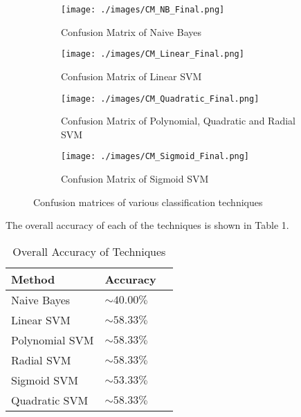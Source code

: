 \documentclass{article}
\begin{document}
\begin{figure}[h!]
    \begin{subfigure}{0.5\textwidth}
      \centering
      \texttt{[image: ./images/CM\_NB\_Final.png]}
      \caption{Confusion Matrix of Naive Bayes}
    \end{subfigure}
    \begin{subfigure}{.5\textwidth}
      \centering
      \texttt{[image: ./images/CM\_Linear\_Final.png]}
      \caption{Confusion Matrix of Linear SVM}
    \end{subfigure}

    \begin{subfigure}{.5\textwidth}
      \centering
      \texttt{[image: ./images/CM\_Quadratic\_Final.png]}
      \caption{Confusion Matrix of Polynomial, Quadratic and Radial SVM}
    \end{subfigure}
    \begin{subfigure}{.5\textwidth}
      \centering
      \texttt{[image: ./images/CM\_Sigmoid\_Final.png]}
      \caption{Confusion Matrix of Sigmoid SVM}
    \end{subfigure}
    \caption{Confusion matrices of various classification techniques}
\end{figure}

The overall accuracy of each of the techniques is shown in Table 1. 

\begin{table}[h!]
\caption{Overall Accuracy of Techniques}
  \label{table1}
  \centering
  \begin{tabular}{lll}
    \toprule
    \cmidrule{1-2}
    Method          & Accuracy             \\
    \midrule
    Naive Bayes     & $\sim$$40.00\%$      \\
    Linear SVM      & $\sim$$58.33\%$      \\
    Polynomial SVM  & $\sim$$58.33\%$      \\
    Radial SVM      & $\sim$$58.33\%$      \\
    Sigmoid SVM     & $\sim$$53.33\%$      \\
    Quadratic SVM   & $\sim$$58.33\%$      \\
    \bottomrule
  \end{tabular}
\end{table}
\end{document}
